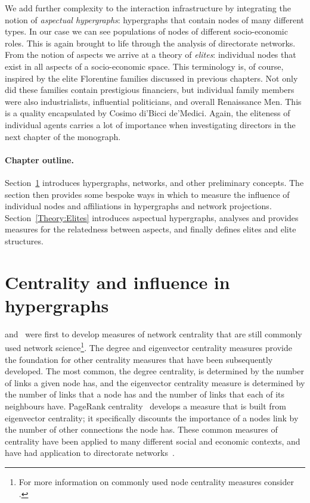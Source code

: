 We add further complexity to the interaction infrastructure by integrating the notion of \emph{aspectual hypergraphs}: hypergraphs that contain nodes of many different types. In our case we can see populations of nodes of different socio-economic roles. This is again brought to life through the analysis of directorate networks. From the notion of aspects we arrive at a theory of \emph{elites}: individual nodes that exist in all aspects of a socio-economic space. This terminology is, of course, inspired by the elite Florentine families discussed in previous chapters. Not only did these families contain prestigious financiers, but individual family members were also industrialists, influential politicians, and overall Renaissance Men. This is a quality encapsulated by Cosimo di'Bicci de'Medici. Again, the eliteness of individual agents carries a lot of importance when investigating directors in the next chapter of the monograph.

\paragraph{Chapter outline.}

Section~\ref{Theory:Influence} introduces hypergraphs, networks, and other preliminary concepts. The section then provides some bespoke ways in which to measure the influence of individual nodes and affiliations in hypergraphs and network projections. Section~\ref{Theory:Elites} introduces aspectual hypergraphs, analyses and provides measures for the relatedness between aspects, and finally defines elites and elite structures.

\section{Centrality and influence in hypergraphs} 
\label{Theory:Influence}

\citet{Freeman1977} and~\citet{Bonacich1972} were first to develop measures of network centrality that are still commonly used network science\footnote{For more information on commonly used node centrality measures consider \citet[Chapter~2]{Jackson2008}.}. The degree and eigenvector centrality measures provide the foundation for other centrality measures that have been subsequently developed. The most common, the degree centrality, is determined by the number of links a given node has, and the eigenvector centrality measure is determined by the number of links that a node has and the number of links that each of its neighbours have. PageRank centrality~\citet{BrinPage1998} develops a measure that is built from eigenvector centrality; it specifically discounts the importance of a nodes link by the number of other connections the node has. These common measures of centrality have been applied to many different social and economic contexts, and have had application to directorate networks~\citep{Khanna2015, ElKhatib2015}.

